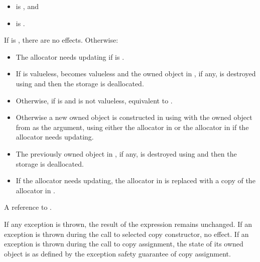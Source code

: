 \begin{itemdescr}
\pnum
\mandates

\begin{itemize}
\item
{} is , and
\item
{} is .
\end{itemize}

\pnum
\effects
If  is , there are no effects.
Otherwise:

\begin{itemize}
\item
The allocator needs updating if
is .

\item
If  is valueless,
 becomes valueless and
the owned object in , if any,
is destroyed using  and
then the storage is deallocated.

\item
Otherwise,
if  is  and
 is not valueless,
equivalent to .

\item
Otherwise a new owned object is constructed in 
using  with
the owned object from  as the argument,
using either the allocator in  or
the allocator in  if the allocator needs updating.

\item
The previously owned object in , if any,
is destroyed using  and
then the storage is deallocated.

\item
If the allocator needs updating,
the allocator in  is replaced with
a copy of the allocator in .
\end{itemize}

\pnum
\returns
A reference to .

\pnum
\remarks
If any exception is thrown,
the result of the expression 
remains unchanged.
If an exception is thrown during
the call to  selected copy constructor, no effect.
If an exception is thrown during the call to  copy assignment,
the state of its owned object
is as defined by the exception safety guarantee of
 copy assignment.
\end{itemdescr}


